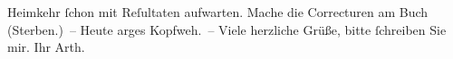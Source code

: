 \begin{ledgroupsized}[t]{13cm}
               Heimkehr ſchon mit Reſultaten aufwarten. Mache die Correcturen am Buch (Sterben.) – Heute arges Kopfweh. – Viele herzliche
               Grüße, bitte ſchreiben Sie mir.\pend
           \pstart Ihr \spacefill\mbox{Arth.}\pend{}\endnumbering{}\end{ledgroupsized}  \newcommand{\dateiname}{L00386}\newcommand{\titel}{Arthur Schnitzler an Richard Beer-Hofmann, 19. 10. 1894}\newcommand{\editorInnen}{Martin Anton Müller und Gerd-Hermann Susen}
            \footnotesize
\begin{ledgroupsized}[t]{11.5cm}
\end{ledgroupsized}
         
      